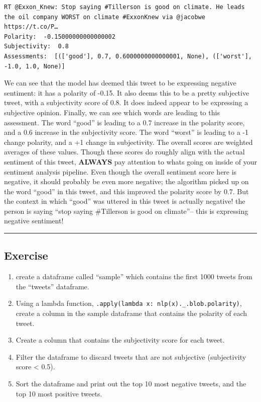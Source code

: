 \documentclass[
  letterpaper,
  DIV=11,
  numbers=noendperiod]{scrreprt}
\providecommand{\tightlist}{%
  \setlength{\itemsep}{0pt}\setlength{\parskip}{0pt}}\usepackage{longtable,booktabs,array}
\begin{document}
\begin{verbatim}
RT @Exxon_Knew: Stop saying #Tillerson is good on climate. He leads the oil company WORST on climate #ExxonKnew via @jacobwe https://t.co/P…
Polarity:  -0.15000000000000002
Subjectivity:  0.8
Assessments:  [(['good'], 0.7, 0.6000000000000001, None), (['worst'], -1.0, 1.0, None)]
\end{verbatim}

We can see that the model has deemed this tweet to be expressing
negative sentiment: it has a polarity of -0.15. It also deems this to be
a pretty subjective tweet, with a subjectivity score of 0.8. It does
indeed appear to be expressing a subjective opinion. Finally, we can see
which words are leading to this assessment. The word ``good'' is leading
to a 0.7 increase in the polarity score, and a 0.6 increase in the
subjectivity score. The word ``worst'' is leading to a -1 change
polarity, and a +1 change in subjectivity. The overall scores are
weighted averages of these values. Though these scores do roughly align
with the actual sentiment of this tweet, \textbf{ALWAYS} pay attention
to whats going on inside of your sentiment analysis pipeline. Even
though the overall sentiment score here is negative, it should probably
be even more negative; the algorithm picked up on the word ``good'' in
this tweet, and this improved the polarity score by 0.7. But the context
in which ``good'' was uttered in this tweet is actually negative! the
person is saying ``stop saying \#Tillerson is good on climate''-- this
is expressing negative sentiment!

\begin{center}\rule{0.5\linewidth}{0.5pt}\end{center}

\hypertarget{exercise-12}{%
\subsection{Exercise}\label{exercise-12}}

\begin{enumerate}
\def\labelenumi{\arabic{enumi}.}
\tightlist
\item
  create a dataframe called ``sample'' which contains the first 1000
  tweets from the ``tweets'' dataframe.
\item
  Using a lambda function,
  \texttt{.apply(lambda\ x:\ nlp(x).\_.blob.polarity)}, create a column
  in the sample dataframe that contains the polarity of each tweet.
\item
  Create a column that contains the subjectivity score for each tweet.
\item
  Filter the dataframe to discard tweets that are not subjective
  (subjectivity score \textless{} 0.5).
\item
  Sort the dataframe and print out the top 10 most negative tweets, and
  the top 10 most positive tweets.
\end{enumerate}
\end{document}
